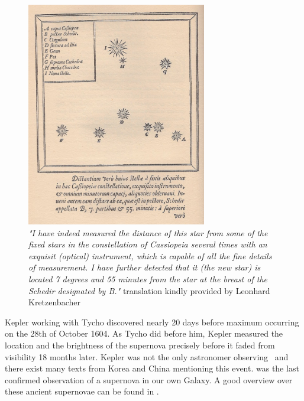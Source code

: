 \begin{figure}[htbp] %
   \centering
   \includegraphics[width=0.7\textwidth]{chapter_intro/plots/Tycho_Cas_SN1572.jpg} 
   \caption{\textit{"I have indeed measured the distance of this star from some of the fixed stars in the constellation of Cassiopeia several times with an exquisit (optical) instrument, which is capable of all the fine details of measurement. I have further detected that it (the new star) is located 7 degrees and 55 minutes from the star at the breast of the Schedir designated by B."} translation kindly provided by Leonhard Kretzenbacher}
   \label{fig:sn1572_tycho_chart}
\end{figure}

Kepler working with Tycho discovered  nearly 20 days before maximum occurring on the 28th of October 1604. As Tycho did before him, Kepler measured the location and the brightness of the supernova precisely \citep[see Figure \ref{fig:sn1604_ancient_lc};][]{kepler1606} before it faded from visibility 18 months later. Kepler was not the only astronomer observing \ and there exist many texts from Korea and China mentioning this event.  was the last confirmed observation of a supernova in our own Galaxy. A good overview over these ancient supernovae can be found in \citet{2003LNP...598....7G}.

